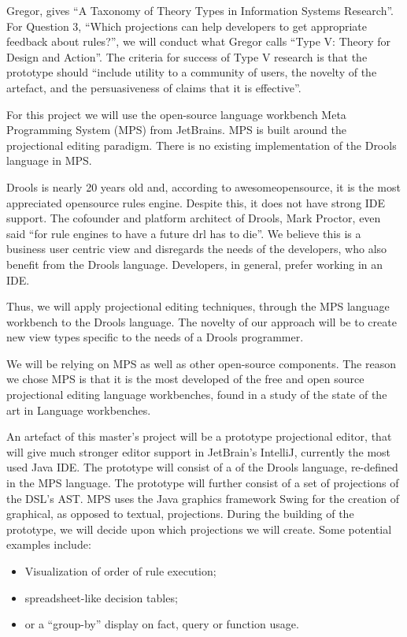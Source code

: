 Gregor\cite{gregor2006nature}, gives ``A Taxonomy of Theory Types in Information Systems Research''. 
For Question 3, ``Which projections can help developers to get appropriate feedback about rules?'', we will conduct what Gregor calls ``Type V: Theory for Design and Action''. 
The criteria for success of Type V research is that the prototype should ``include utility to a community of users, the novelty of the artefact, and the persuasiveness of claims that it is effective''.

For this project we will use the open-source language workbench Meta Programming System (MPS) from JetBrains\cite{MPS_ProductPage}.
MPS is built around the projectional editing paradigm.
There is no existing implementation of the Drools language in MPS.

Drools is nearly 20 years old and, according to awesomeopensource\cite{awesomeopensource}, it is the most appreciated opensource rules engine.
Despite this, it does not have strong IDE support.
The cofounder and platform architect of Drools, Mark Proctor, even said ``for rule engines to have a future drl has to die''\cite{Proctor_happenings}.
We believe this is a business user centric view and disregards the needs of the developers, who also benefit from the Drools language.
Developers, in general, prefer working in an IDE.

Thus, we will apply projectional editing techniques, through the MPS language workbench to the Drools language.
The novelty of our approach will be to create new view types specific to the needs of a Drools programmer.

We will be relying on MPS as well as other open-source components.
The reason we chose MPS is that it is the most developed of the free and open source projectional editing language workbenches, found in a study of the state of the art in Language workbenches\cite{erdweg2013state}.

An artefact of this master's project will be a prototype projectional editor, that will give much stronger editor support in JetBrain's IntelliJ, currently the most used Java IDE\cite{Java_usage_report}.
The prototype will consist of a of the Drools language, re-defined in the MPS language.  
The prototype will further consist of a set of projections of the DSL's AST.
MPS uses the Java graphics framework Swing for the creation of graphical, as opposed to textual, projections.
During the building of the prototype, we will decide upon which projections we will create. 
Some potential examples include:
\begin{itemize}
    \item Visualization of order of rule execution;
    \item spreadsheet-like decision tables;
    \item or a ``group-by'' display on fact, query or function usage.
\end{itemize}

